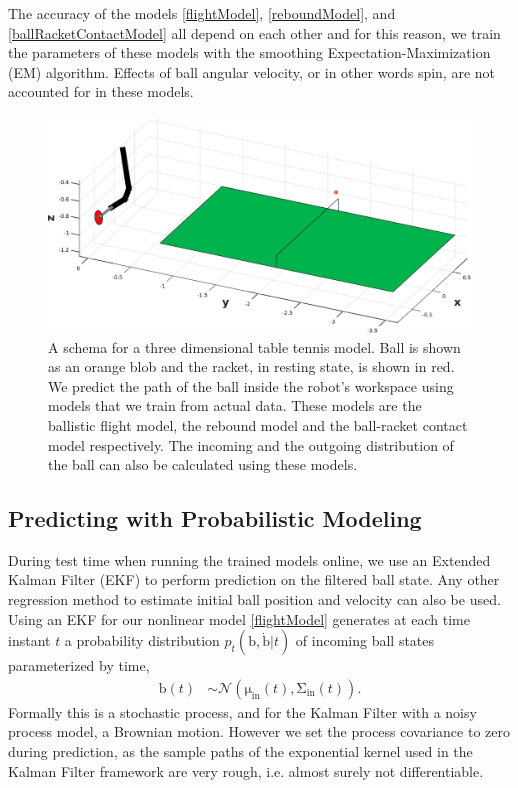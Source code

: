 \documentclass[letterpaper, 10 pt, conference]{ieeeconf}
\newcommand{\boldvec}[1]{\boldsymbol{\mathrm{#1}}}
\let\vec\boldvec
\newcommand{\ball}{\vec{b}} %
\begin{document}
The accuracy of the models \eqref{flightModel}, \eqref{reboundModel}, and \eqref{ballRacketContactModel} all depend on each other and for this reason, we train the parameters of these models with the smoothing Expectation-Maximization (EM) algorithm. Effects of ball angular velocity, or in other words spin, are not accounted for in these models.

\begin{figure}[t!]
\centering
\includegraphics[scale=0.25]{tableTennis3D.eps}			
\caption{A schema for a three dimensional table tennis model. Ball is shown as an orange blob and the racket, in resting state, is shown in red. We predict the path of the ball inside the robot's workspace using models that we train from actual data. These models are the ballistic flight model, the rebound model and the ball-racket contact model respectively. The incoming and the outgoing distribution of the ball can also be calculated using these models.}
\label{models}
\end{figure}

\subsection{Predicting with Probabilistic Modeling}\label{sectionPredict}
 
During test time when running the trained models online, we use an Extended Kalman Filter (EKF) to perform prediction on the filtered ball state. Any other regression method to estimate initial ball position and velocity can also be used.
Using an EKF for our nonlinear model \eqref{flightModel} generates at each time instant $t$ a probability distribution $p_t(\ball,\dot{\ball}|t)$ of incoming ball states parameterized by time, 
%
\begin{align}
\ball(t) &\sim \mathcal{N}(\vec{\mu}_{\textrm{in}}(t),\vec{\Sigma}_{\textrm{in}}(t)). 
\label{ballProcess}
\end{align}
%
%
\noindent Formally this is a stochastic process, and for the Kalman Filter with a noisy process model, a Brownian motion. However we set the process covariance to zero during prediction, as the sample paths of the exponential kernel used in the Kalman Filter framework are very rough, i.e. almost surely not differentiable.
\end{document}
